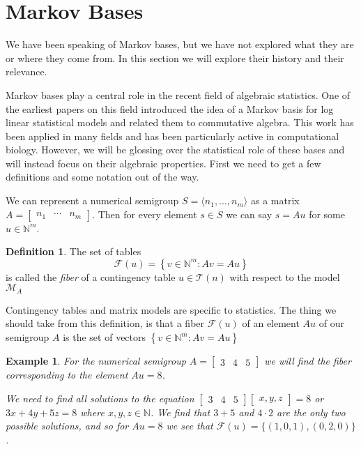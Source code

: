\documentclass[11pt]{amsart}
\theoremstyle{plain}
\newtheorem{exa}{Example}
\theoremstyle{definition}
\newtheorem{defi}{Definition}
\begin{document}
\section{Markov Bases}
We have been speaking of Markov bases, but we have not explored what they are or
where they come from. In this section we will explore their history and their
relevance.

Markov bases play a central role in the recent field of algebraic statistics.
One of the earliest papers on this field\cite{bernd} introduced the idea of a
Markov basis for log linear statistical models\cite{markstats} and related them
to commutative algebra. This work has been applied in many fields and has been
particularly active in computational biology. However, we will be glossing over
the statistical role of these bases and will instead focus on their algebraic
properties. First we need to get a few definitions and some notation out of the
way.

We can represent a numerical semigroup $S=\langle n_1,\dots,n_m \rangle$ as a
matrix $A=\left[\begin{array}{rrr}n_1&\cdots&n_m\end{array}\right]$. Then for
every element $s\in S$ we can say $s=Au$ for some $u\in \mathbb{N}^m$.

\begin{defi}
  \cite{bernd}
  The set of tables
  \[\mathcal{F}(u)=\left\{v\in \mathbb{N}^m:Av=Au\right\}\]
  is called the \emph{fiber} of a contingency table $u\in \mathcal{T}(n)$ with
  respect to the model $\mathcal{M}_A$
\end{defi}

Contingency tables and matrix models are specific to statistics. The thing we
should take from this definition, is that a fiber $\mathcal{F}(u)$ of an element
$Au$ of our semigroup $A$ is the set of vectors $\left\{v\in \mathbb{N}^m:Av=Au
\right\}$
\begin{exa}
  For the numerical semigroup $A=\left[\begin{array}{rrr}3&4&5\end{array}\right]$
  we will find the fiber corresponding to the element $Au=8$.

  We need to find all solutions to the equation $\left[\begin{array}{rrr}3&4&5
\end{array}\right]\left[\begin{array}{rrr}x,y,z \end{array}\right]=8$ or
$3x+4y+5z=8$ where $x,y,z\in \mathbb{N}$. We find that $3+5$ and $4\cdot 2$ are
the only two possible solutions, and so for $Au=8$ we see that $\mathcal{F}(u)=
\{(1,0,1),(0,2,0)\}$.
\end{exa}
\end{document}
